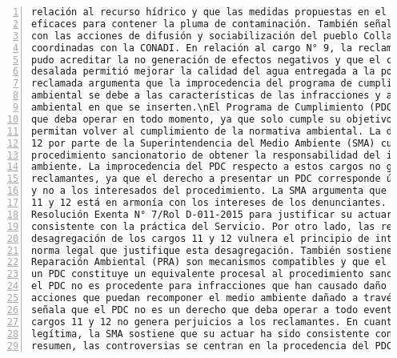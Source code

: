 \begin{Verbatim}[frame=lines, label=Elavoración propia -  Ejemplo de Contexto enviado por el Chatbot a OpenAI
				, fontsize=\scriptsize, numbers=left
				, baselinestretch=0.4
				, formatcom=\color{gray}]
relación al recurso hídrico y que las medidas propuestas en el programa de cumplimiento son
eficaces para contener la pluma de contaminación. También señala que la empresa ha cumplido
con las acciones de difusión y sociabilización del pueblo Colla, pese a no haber sido
coordinadas con la CONADI. En relación al cargo N° 9, la reclamada sostiene que la empresa
pudo acreditar la no generación de efectos negativos y que el caudal entregado de agua
desalada permitió mejorar la calidad del agua entregada a la población. Por último, la
reclamada argumenta que la improcedencia del programa de cumplimiento en casos de daño
ambiental se debe a las características de las infracciones y al contexto regulatorio
ambiental en que se inserten.\nEl Programa de Cumplimiento (PDC) no es un derecho del titular
que deba operar en todo momento, ya que solo cumple su objetivo a través de medidas que
permitan volver al cumplimiento de la normativa ambiental. La desagregación de los cargos 11 y
12 por parte de la Superintendencia del Medio Ambiente (SMA) cumple con la finalidad del
procedimiento sancionatorio de obtener la responsabilidad del infractor y proteger el medio
ambiente. La improcedencia del PDC respecto a estos cargos no genera perjuicios a los
reclamantes, ya que el derecho a presentar un PDC corresponde únicamente al presunto infractor
y no a los interesados del procedimiento. La SMA argumenta que la desagregación de los cargos
11 y 12 está en armonía con los intereses de los denunciantes. Además, la SMA se refiere a la
Resolución Exenta N° 7/Rol D-011-2015 para justificar su actuar y sostiene que ha sido
consistente con la práctica del Servicio. Por otro lado, las reclamantes argumentan que la
desagregación de los cargos 11 y 12 vulnera el principio de integridad y que no existe una
norma legal que justifique esta desagregación. También sostienen que el PDC y los Planes de
Reparación Ambiental (PRA) son mecanismos compatibles y que el cumplimiento satisfactorio de
un PDC constituye un equivalente procesal al procedimiento sancionatorio. La SMA argumenta que
el PDC no es procedente para infracciones que han causado daño ambiental, ya que no existen
acciones que puedan recomponer el medio ambiente dañado a través de este instrumento. Además,
señala que el PDC no es un derecho que deba operar a todo evento y que la desagregación de los
cargos 11 y 12 no genera perjuicios a los reclamantes. En cuanto al principio de confianza
legítima, la SMA sostiene que su actuar ha sido consistente con sus propios precedentes. En
resumen, las controversias se centran en la procedencia del PDC para infracciones que han

\end{Verbatim}
